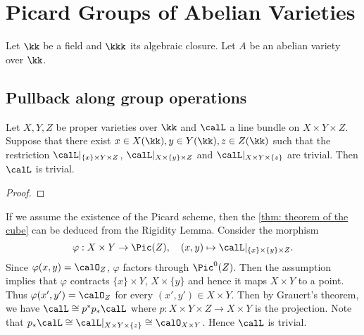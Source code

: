 \section{Picard Groups of Abelian Varieties}

Let \(\kk\) be a field and \(\kkk\) its algebraic closure.
Let \(A\) be an abelian variety over \(\kk\).

\subsection{Pullback along group operations}

        

    \begin{theorem}\label{thm: theorem of the cube}
        Let \(X,Y,Z\) be proper varieties over \(\kk\) and \(\calL\) a line bundle on \(X \times Y \times Z\). 
        Suppose that there exist \(x \in X(\kk), y \in Y(\kk), z \in Z(\kk)\) such that the restriction \(\calL|_{\{x\} \times Y \times Z}\), \(\calL|_{X \times \{y\} \times Z}\) and \(\calL|_{X \times Y \times \{z\}}\) are trivial. 
        Then \(\calL\) is trivial.
    \end{theorem}
    \begin{proof}
    \end{proof}

    \begin{remark}\label{rmk: theorem of the cube by rigidity lemma and picard scheme}
        If we assume the existence of the Picard scheme, then the \cref{thm: theorem of the cube} can be deduced from the Rigidity Lemma.
        Consider the morphism
        \[ \varphi: X \times Y \to \Pic(Z), \quad (x,y) \mapsto \calL|_{\{x\} \times \{y\} \times Z}. \]
        Since \(\varphi(x,y) = \calO_Z\), \(\varphi\) factors through \(\Pic^0(Z)\).
        Then the assumption implies that \(\varphi\) contracts \(\{x\} \times Y\), \(X \times \{y\}\) and hence it maps \(X \times Y\) to a point.
        Thus \(\varphi(x',y') = \calO_Z\) for every \((x',y') \in X \times Y\).
        Then by Grauert's theorem, we have \(\calL \cong p^*p_*\calL\) where \(p: X \times Y \times Z \to X \times Y\) is the projection.
        Note that \(p_*\calL \cong \calL|_{X \times Y \times \{z\}} \cong \calO_{X \times Y}\).
        Hence \(\calL\) is trivial.
    \end{remark}

